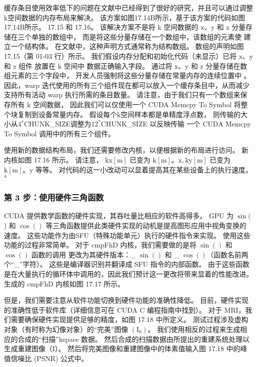 缓存条目使用效率低下的问题在文献中已经得到了很好的研究，并且可以通过调整k空间数据的内存布局来解决。 
该方案如图17.14B所示，基于该方案的代码如图17.14B所示。 17.15 和 17.16。 
该解决方案不是将 k 空间数据的 $\mathrm{x}、\mathrm{y}$ 和 $\mathrm{z}$ 分量存储在三个单独的数组中，
而是将这些分量存储在一个数组中，该数组的元素使 建立一个结构体。 在文献中，这种声明方式通常称为结构数组。 
数组的声明如图 17.15（第 01-03 行）所示。 
我们假设内存分配和初始化代码（未显示）已将 $\mathrm{x}、\mathrm{y}$ 和 $\mathrm{z}$ 组件
放置在 $\mathrm{k}$ 空间中 数据正确输入字段。 
通过将 $\mathrm{x}、\mathrm{y}$ 和 $\mathrm{z}$ 分量存储在数组元素的三个字段中，
开发人员强制将这些分量存储在常量内存的连续位置中 。 
因此，warp 迭代使用的所有三个组件现在都可以放入一个缓存条目中，从而减少支持所有活动 warp 执行所需的条目数量。 
请注意，由于我们只有一个数组来保存所有 k 空间数据，
因此我们可以仅使用一个 CUDA Memcpy To Symbol 将整个块复制到设备常量内存。 
假设每个k空间样本都是单精度浮点数，
则传输的大小从$4{}^{*}$CHUNK\_SIZE调整为$12^{*}$CHUNK\_SIZE
以反映传输 一个 CUDA Memcpy To Symbol 调用中的所有三个组件。

使用新的数据结构布局，我们还需要修改内核，以便根据新的布局进行访问。 新内核如图 17.16 所示。 
请注意， $\mathrm{kx}[\mathrm{m}]$ 已变为 $\mathrm{k}[\mathrm{m}] 。 
\mathrm{x}, \mathrm{ky}[\mathrm{m}]$ 已变为 $\mathrm{k}[\mathrm{m}] 。 \mathrm{y}$ 等等。 
对代码的这一小改动可以显着提高其在某些设备上的执行速度。 ${ }^{4}$

\subsubsection{第 3 步：使用硬件三角函数}
CUDA 提供数学函数的硬件实现，其吞吐量比相应的软件高得多。 
GPU 为 $\sin ($ ) 和 $\cos ()$ 等三角函数提供此类硬件实现的动机是提高图形应用中视角变换的速度。 
这些功能作为由SFU（特殊功能单元）执行的硬件指令来实现。 使用这些功能的过程非常简单。 
对于 cmpFhD 内核，我们需要做的是将 $\sin ()$ 和 $\cos ()$ 函数的调用
更改为其硬件版本：\_ $\sin ()$ 和 \_ $ \cos ()$（函数名前两个“\_”字符）。 
这些是编译器识别并翻译成 SFU 指令的内部函数。 
由于这些函数是在大量执行的循环体中调用的，因此我们预计这一更改将带来显着的性能改进。 生成的 cmpFhD 内核如图 17.17 所示。

但是，我们需要注意从软件功能切换到硬件功能的准确性降低。 
目前，硬件实现的准确性低于软件库（详细信息可在 CUDA C 编程指南中找到）。 
对于 MRI，我们需要确保硬件实现提供足够的精度，如图 17.18 中所定义。 
测试过程涉及虚构对象（有时称为幻像对象）的“完美”图像 $\left(\mathrm{I}_{0}\right)$。 
我们使用相反的过程来生成相应的合成的“扫描”kspace 数据。 然后合成的扫描数据由所提出的重建系统处理以生成重建图像（I）。 
然后将完美图像和重建图像中的体素值输入图 17.18 中的峰值信噪比 (PSNR) 公式中。

